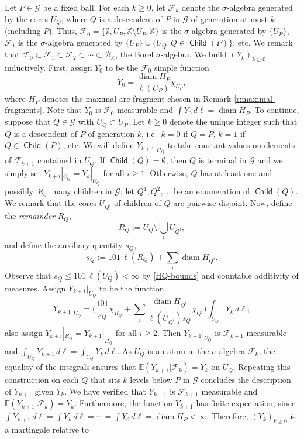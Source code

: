 \documentclass[12pt]{amsart}
\numberwithin{equation}{section}
\theoremstyle{plain}
\theoremstyle{definition}
\def\XX{{\mathbb{X}}}
\newcommand{\diam}{\mathop\mathrm{diam}\nolimits}
\newcommand{\Child}{\mathop\mathsf{Child}\nolimits}
\numberwithin{figure}{section}
\begin{document}
Let $P\in\mathscr{G}$ be a fixed ball. For each $k\geq 0$, let $\mathcal{F}_k$ denote the $\sigma$-algebra generated by the cores $U_{Q}$, where $Q$ is a descendent of $P$ in $\mathscr{G}$ of generation at most $k$ (including $P$). Thus, $\mathcal{F}_0=\{\emptyset,U_P,\XX\setminus U_P,\XX\}$ is the $\sigma$-algebra generated by $\{U_P\}$, $\mathcal{F}_1$ is the $\sigma$-algebra generated by $\{U_P\}\cup\{U_Q:Q\in\Child(P)\}$, etc. We remark that $\mathcal{F}_0\subset\mathcal{F}_1\subset\mathcal{F}_2\subset \cdots\subset\mathcal{B}_\XX$, the Borel $\sigma$-algebra.
We build $(Y_k)_{k\geq 0}$ inductively. First, assign $Y_0$ to be the $\mathcal{F}_0$ simple function \begin{equation}\label{X-0} Y_0=\frac{\diam H_P}{\ell(U_P)}\chi_{U_P},\end{equation} where $H_P$ denotes the maximal arc fragment chosen in Remark \ref{r:maximal-fragments}. Note that $Y_0$ is $\mathcal{F}_0$ measurable and $\int Y_0\,d\ell = \diam H_P$. To continue, suppose that $Q\in\mathscr{G}$ with $U_Q\subset U_P$. Let $k\geq 0$ denote the unique integer such that $Q$ is a descendent of $P$ of generation $k$, i.e.~$k=0$ if $Q=P$, $k=1$ if $Q\in\Child(P)$, etc. We will define $Y_{k+1}|_{U_Q}$ to take constant values on elements of $\mathcal{F}_{k+1}$ contained in $U_Q$. If $\Child(Q)=\emptyset$, then $Q$ is terminal in $\mathscr{G}$ and we simply set $Y_{k+i}|_{U_Q}=Y_k|_{U_Q}$ for all $i\geq 1$. Otherwise, $Q$ has at least one and possibly $\aleph_0$ many children in $\mathscr{G}$; let  $Q^1,Q^2,\dots$ be an enumeration of $\Child(Q)$. We remark that the cores $U_{Q^i}$ of children of $Q$ are pairwise disjoint. Now, define the \emph{remainder} $R_Q$, \begin{equation}\label{remainder} R_Q:=U_Q \setminus \textstyle\bigcup_i U_{Q^i},\end{equation} and define the auxiliary quantity $s_Q$, \begin{equation}\label{s-Q} s_Q:=101\,\ell(R_Q)+\textstyle\sum_i \diam H_{Q^i}.\end{equation} Observe that $s_Q\leq 101\,\ell(U_Q)<\infty$ by \eqref{HQ-bounds} and countable additivity of measures.  Assign $Y_{k+1}|_{U_Q}$ to be the function \begin{equation}\label{X-next} Y_{k+1}|_{U_Q}= \Big(\frac{101}{s_Q}\chi_{R_Q} + \sum_{i} \frac{\diam H_{Q^i}}{\ell(U_{Q^i})s_Q}\chi_{Q^i}\Big)\int_{U_Q} Y_k\,d\ell;\end{equation} also assign $Y_{k+i}|_{R_Q}=Y_{k+1}|_{R_Q}$ for all $i\geq 2$. Then $Y_{k+1}|_{U_Q}$ is $\mathcal{F}_{k+1}$ measurable and $\int_{U_Q} Y_{k+1}\,d\ell=\int_{U_Q} Y_k\,d\ell$. As $U_Q$ is an atom in the $\sigma$-algebra $\mathcal{F}_k$, the equality of the integrals ensures that $\mathbb{E}(Y_{k+1}|\mathcal{F}_k)= Y_k$ on $U_Q$. Repeating this construction on each $Q$ that sits $k$ levels below $P$ in $\mathscr{G}$ concludes the description of $Y_{k+1}$ given $Y_k$. We have verified that $Y_{k+1}$ is $\mathcal{F}_{k+1}$ measurable and $\mathbb{E}(Y_{k+1}|\mathcal{F}_k)=Y_k$. Furthermore, the function $Y_{k+1}$ has finite expectation, since $\int Y_{k+1}\,d\ell=\int Y_k\,d\ell=\cdots=\int Y_0\,d\ell=\diam H_P<\infty$. Therefore, $(Y_k)_{k\geq 0}$ is a martingale relative to 
\end{document}
